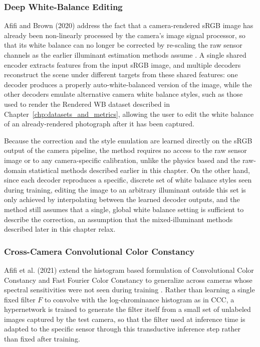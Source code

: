 \subsubsection{Deep White-Balance Editing}

Afifi and Brown (2020) address the fact that a camera-rendered sRGB image has already been non-linearly processed by the camera's image signal processor, so that its white balance can no longer be corrected by re-scaling the raw sensor channels as the earlier illuminant estimation methods assume \cite{afifi2020deepWB}. A single shared encoder extracts features from the input sRGB image, and multiple decoders reconstruct the scene under different targets from these shared features: one decoder produces a properly auto-white-balanced version of the image, while the other decoders emulate alternative camera white balance styles, such as those used to render the Rendered WB dataset described in Chapter~\ref{chp:datasets_and_metrics}, allowing the user to edit the white balance of an already-rendered photograph after it has been captured.

Because the correction and the style emulation are learned directly on the sRGB output of the camera pipeline, the method requires no access to the raw sensor image or to any camera-specific calibration, unlike the physics based and the raw-domain statistical methods described earlier in this chapter. On the other hand, since each decoder reproduces a specific, discrete set of white balance styles seen during training, editing the image to an arbitrary illuminant outside this set is only achieved by interpolating between the learned decoder outputs, and the method still assumes that a single, global white balance setting is sufficient to describe the correction, an assumption that the mixed-illuminant methods described later in this chapter relax.

\subsubsection{Cross-Camera Convolutional Color Constancy}

Afifi et al. (2021) extend the histogram based formulation of Convolutional Color Constancy and Fast Fourier Color Constancy to generalize across cameras whose spectral sensitivities were not seen during training \cite{afifi2022crosscameraconvolutionalcolorconstancy}. Rather than learning a single fixed filter $F$ to convolve with the log-chrominance histogram as in CCC, a hypernetwork is trained to generate the filter itself from a small set of unlabeled images captured by the test camera, so that the filter used at inference time is adapted to the specific sensor through this transductive inference step rather than fixed after training.

